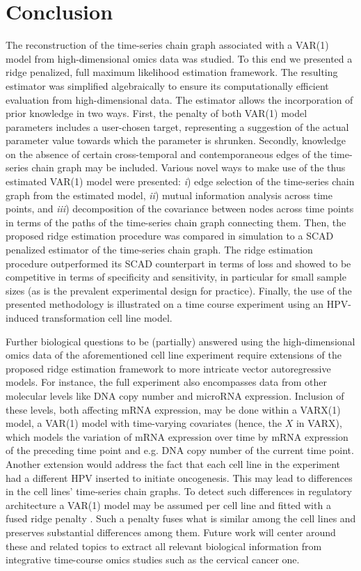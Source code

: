 \section{Conclusion}
The reconstruction of the time-series chain graph associated with a VAR(1) model from high-dimensional omics data was studied. To this end we presented a ridge penalized, full maximum likelihood estimation framework. The resulting estimator was simplified algebraically to ensure its computationally efficient evaluation from high-dimensional data. The estimator allows the incorporation of prior knowledge in two ways. First, the penalty of both VAR(1) model parameters includes a user-chosen target, representing a suggestion of the actual parameter value towards which the parameter is shrunken. Secondly, knowledge on the absence of certain cross-temporal and contemporaneous edges of the time-series chain graph may be included. Various novel ways to make use of the thus estimated  VAR(1) model were presented: \textit{i}) edge selection of the time-series chain graph from the estimated model, \textit{ii}) mutual information analysis across time points, and \textit{iii}) decomposition of the covariance between nodes across time points in terms of the paths of the time-series chain graph connecting them. Then, the proposed ridge estimation procedure was compared in simulation to a SCAD penalized estimator of the time-series chain graph. The ridge estimation procedure outperformed its SCAD counterpart in terms of loss and showed to be competitive in terms of specificity and sensitivity, in particular for small sample sizes (as is the prevalent experimental design for practice). Finally, the use of the presented methodology is illustrated on a time course experiment using an HPV-induced transformation cell line model.

Further biological questions to be (partially) answered using the high-dimensional omics data of the aforementioned cell line experiment require extensions of the proposed ridge estimation framework to more intricate vector autoregressive models. For instance, the full experiment also encompasses data from other molecular levels like DNA copy number and microRNA expression. Inclusion of these levels, both affecting mRNA expression, may be done within a VARX(1) model, a VAR(1) model with time-varying covariates (hence, the $X$ in VARX), which models the variation of mRNA expression over time by mRNA expression of the preceding time point and e.g. DNA copy number of the current time point. Another extension would address the fact that each cell line in the experiment had a different HPV inserted to initiate oncogenesis. This may lead to differences in the cell lines' time-series chain graphs. To detect such differences in regulatory architecture a VAR(1) model may be assumed per cell line and fitted with a fused ridge penalty \cite{Bilgrau2015}. Such a penalty fuses what is similar among the cell lines and preserves substantial differences among them. Future work will center around these and related topics to extract all relevant biological information from integrative time-course omics studies such as the cervical cancer one.

